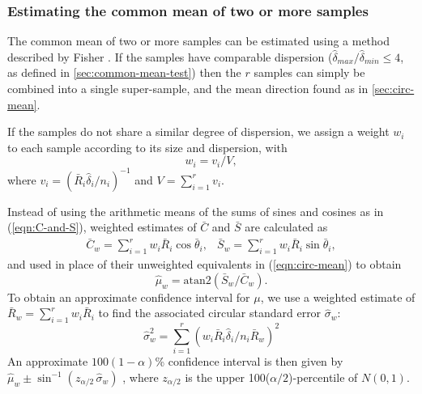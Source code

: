 \documentclass[../../ArchStats.tex]{subfiles}
\begin{document}
\subsubsection{Estimating the common mean of two or more samples}
\label{sec:est-pooled-mean}

The common mean of two or more samples can be estimated using a method described by Fisher \cite[section 5.3.5]{Fisher1993}. If the samples have comparable dispersion ($\hat{\delta}_{max} / \hat{\delta}_{min} \leq 4$, as defined in \ref{sec:common-mean-test}) then the $r$ samples can simply be combined into a single super-sample, and the mean direction found as in \ref{sec:circ-mean}.

If the samples do not share a similar degree of dispersion, we assign a weight $w_i$ to each sample according to its size and dispersion, with
\begin{equation}
w_i = v_i/V,
\end{equation}
where $v_i = (\bar{R}_i \hat{\delta}_i / n_i)^{-1}$ and $V = \sum_{i=1}^r v_i$.

Instead of using the arithmetic means of the sums of sines and cosines as in (\ref{eqn:C-and-S}), weighted estimates of $\bar{C}$ and $\bar{S}$ are calculated as
	\begin{equation}
	\begin{matrix*}
	\bar{C}_w = \sum_{i=1}^r w_i \bar{R}_i \cos \bar{\theta}_i, & 
	\bar{S}_w = \sum_{i=1}^r w_i \bar{R}_i \sin \bar{\theta}_i,
	\end{matrix*}
	\end{equation}
and used in place of their unweighted equivalents in (\ref{eqn:circ-mean}) to obtain
\begin{equation}\hat{\mu}_w = \text{atan2}(\bar{S}_w/\bar{C}_w).\end{equation}
To obtain an approximate confidence interval for $\mu$, we use a weighted estimate of $\bar{R}_w = \sum_{i=1}^r w_i \bar{R}_i$ to find the associated circular standard error $\hat{\sigma}_w$:
	\begin{equation}
 	\hat{\sigma}_w^2 = \sum_{i=1}^r \left( w_i \bar{R}_i \hat{\delta}_i / n_i \bar{R}_w \right) ^2
	\end{equation}
An approximate $100(1-\alpha)$\% confidence interval is then given by
 $ \hat{\mu}_w \pm \sin^{-1}(z_{\alpha/2} \, \hat{\sigma}_w)$ ,
where $z_{\alpha/2}$ is the upper 100($\alpha/2$)-percentile of $N(0,1)$.
\end{document}
